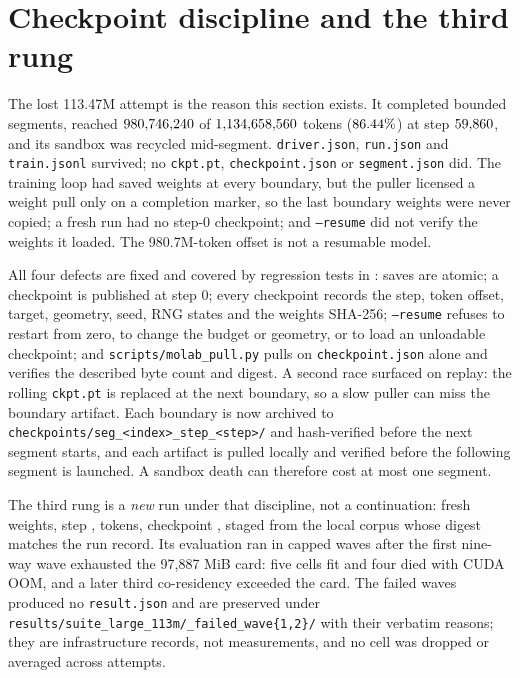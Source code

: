 \section{Checkpoint discipline and the third rung}
\label{app:checkpoint}

The lost 113.47M attempt is the reason this section exists. It completed
\SuiteLostSegments{} bounded segments, reached $980{,}746{,}240$ of
$1{,}134{,}658{,}560$ tokens ($86.44\%$) at step $59{,}860$, and its
sandbox was recycled mid-segment.
\texttt{driver.json}, \texttt{run.json} and \texttt{train.jsonl} survived; no
\texttt{ckpt.pt}, \texttt{checkpoint.json} or \texttt{segment.json} did. The
training loop had saved weights at every boundary, but the puller licensed a
weight pull only on a completion marker, so the last boundary weights were never
copied; a fresh run had no step-0 checkpoint; and \texttt{--resume} did not
verify the weights it loaded. The 980.7M-token offset is not a resumable model.

All four defects are fixed and covered by regression tests in
: saves are atomic; a checkpoint is published at step 0; every checkpoint records the step,
token offset, target, geometry, seed, RNG states and the weights SHA-256;
\texttt{--resume} refuses to restart from zero, to change the budget or geometry,
or to load an unloadable checkpoint; and \texttt{scripts/molab\_pull.py} pulls on
\texttt{checkpoint.json} alone and verifies the described byte count and digest. A
second race surfaced on replay: the rolling \texttt{ckpt.pt} is replaced at the
next boundary, so a slow puller can miss the boundary artifact. Each boundary is
now archived to \texttt{checkpoints/seg\_<index>\_step\_<step>/} and hash-verified
before the next segment starts, and each artifact is pulled locally and verified
before the following segment is launched. A sandbox death can therefore cost at
most one segment.

The third rung is a \emph{new} run under that discipline, not a continuation:
fresh weights, step \SuiteCkptLargeStep, \SuiteCkptLargeTokens{} tokens,
checkpoint \SuiteCkptLarge, staged from the local corpus whose digest matches the
run record. Its evaluation ran in capped waves after the first nine-way wave
exhausted the 97{,}887 MiB card: five cells fit and four died with CUDA OOM, and
a later third co-residency exceeded the card. The failed waves produced
no \texttt{result.json} and are preserved under
\texttt{results/}\allowbreak\texttt{suite\_large\_113m/}\allowbreak\texttt{\_failed\_wave\{1,2\}/}
with their verbatim reasons; they are infrastructure records, not measurements,
and no cell was dropped or averaged across attempts.


